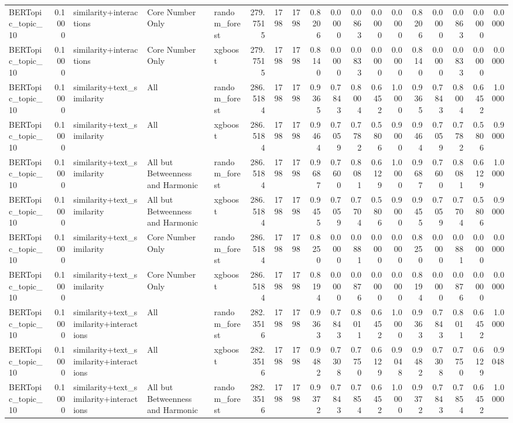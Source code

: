 \begin{tabular}{lrlllrrrrrrrrrrrrr}
BERTopic_topic_10 & 0.1000 & similarity+interactions & Core Number Only & random_forest & 279.7515 & 1798 & 1798 & 0.8206 & 0.0000 & 0.0863 & 0.0000 & 0.0000 & 0.8206 & 0.0000 & 0.0863 & 0.0000 & 0.0000 \\
BERTopic_topic_10 & 0.1000 & similarity+interactions & Core Number Only & xgboost & 279.7515 & 1798 & 1798 & 0.8140 & 0.0000 & 0.0833 & 0.0000 & 0.0000 & 0.8140 & 0.0000 & 0.0833 & 0.0000 & 0.0000 \\
BERTopic_topic_10 & 0.1000 & similarity+text_similarity & All & random_forest & 286.5184 & 1798 & 1798 & 0.9365 & 0.7843 & 0.8004 & 0.6452 & 1.0000 & 0.9365 & 0.7843 & 0.8004 & 0.6452 & 1.0000 \\
BERTopic_topic_10 & 0.1000 & similarity+text_similarity & All & xgboost & 286.5184 & 1798 & 1798 & 0.9464 & 0.7059 & 0.7782 & 0.5806 & 0.9000 & 0.9464 & 0.7059 & 0.7782 & 0.5806 & 0.9000 \\
BERTopic_topic_10 & 0.1000 & similarity+text_similarity & All but Betweenness and Harmonic & random_forest & 286.5184 & 1798 & 1798 & 0.9687 & 0.7600 & 0.8081 & 0.6129 & 1.0000 & 0.9687 & 0.7600 & 0.8081 & 0.6129 & 1.0000 \\
BERTopic_topic_10 & 0.1000 & similarity+text_similarity & All but Betweenness and Harmonic & xgboost & 286.5184 & 1798 & 1798 & 0.9455 & 0.7059 & 0.7704 & 0.5806 & 0.9000 & 0.9455 & 0.7059 & 0.7704 & 0.5806 & 0.9000 \\
BERTopic_topic_10 & 0.1000 & similarity+text_similarity & Core Number Only & random_forest & 286.5184 & 1798 & 1798 & 0.8250 & 0.0000 & 0.0881 & 0.0000 & 0.0000 & 0.8250 & 0.0000 & 0.0881 & 0.0000 & 0.0000 \\
BERTopic_topic_10 & 0.1000 & similarity+text_similarity & Core Number Only & xgboost & 286.5184 & 1798 & 1798 & 0.8194 & 0.0000 & 0.0876 & 0.0000 & 0.0000 & 0.8194 & 0.0000 & 0.0876 & 0.0000 & 0.0000 \\
BERTopic_topic_10 & 0.1000 & similarity+text_similarity+interactions & All & random_forest & 282.3516 & 1798 & 1798 & 0.9363 & 0.7843 & 0.8011 & 0.6452 & 1.0000 & 0.9363 & 0.7843 & 0.8011 & 0.6452 & 1.0000 \\
BERTopic_topic_10 & 0.1000 & similarity+text_similarity+interactions & All & xgboost & 282.3516 & 1798 & 1798 & 0.9482 & 0.7308 & 0.7750 & 0.6129 & 0.9048 & 0.9482 & 0.7308 & 0.7750 & 0.6129 & 0.9048 \\
BERTopic_topic_10 & 0.1000 & similarity+text_similarity+interactions & All but Betweenness and Harmonic & random_forest & 282.3516 & 1798 & 1798 & 0.9372 & 0.7843 & 0.7854 & 0.6452 & 1.0000 & 0.9372 & 0.7843 & 0.7854 & 0.6452 & 1.0000 \\

\end{tabular}
